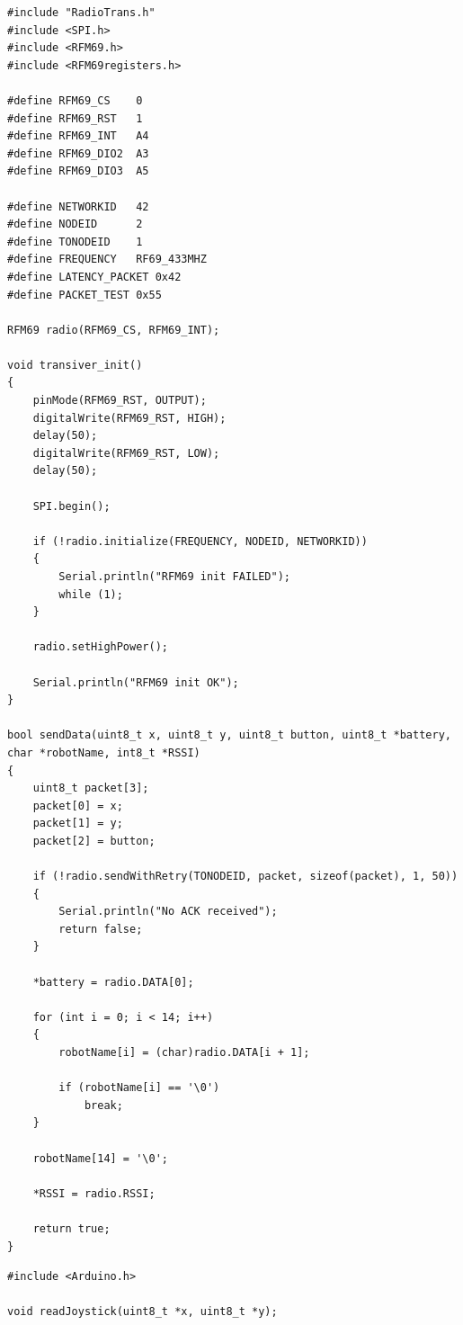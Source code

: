 \begin{lstlisting}[style=appendix, caption={Remote --- RadioTrans.cpp}, label={lst:remote-radio}]
#include "RadioTrans.h"
#include <SPI.h>
#include <RFM69.h>
#include <RFM69registers.h>

#define RFM69_CS    0
#define RFM69_RST   1
#define RFM69_INT   A4
#define RFM69_DIO2  A3
#define RFM69_DIO3  A5

#define NETWORKID   42
#define NODEID      2
#define TONODEID    1
#define FREQUENCY   RF69_433MHZ
#define LATENCY_PACKET 0x42
#define PACKET_TEST 0x55

RFM69 radio(RFM69_CS, RFM69_INT);

void transiver_init()
{
    pinMode(RFM69_RST, OUTPUT);
    digitalWrite(RFM69_RST, HIGH);
    delay(50);
    digitalWrite(RFM69_RST, LOW);
    delay(50);

    SPI.begin();

    if (!radio.initialize(FREQUENCY, NODEID, NETWORKID))
    {
        Serial.println("RFM69 init FAILED");
        while (1);
    }

    radio.setHighPower();

    Serial.println("RFM69 init OK");
}

bool sendData(uint8_t x, uint8_t y, uint8_t button, uint8_t *battery, char *robotName, int8_t *RSSI)
{
    uint8_t packet[3];
    packet[0] = x;
    packet[1] = y;
    packet[2] = button;

    if (!radio.sendWithRetry(TONODEID, packet, sizeof(packet), 1, 50))
    {
        Serial.println("No ACK received");
        return false;
    }

    *battery = radio.DATA[0];

    for (int i = 0; i < 14; i++)
    {
        robotName[i] = (char)radio.DATA[i + 1];

        if (robotName[i] == '\0')
            break;
    }

    robotName[14] = '\0';

    *RSSI = radio.RSSI;

    return true;
}
\end{lstlisting}

\begin{lstlisting}[style=appendix, caption={Remote --- Joystick.h}, label={lst:remote-joystick-h}]
#include <Arduino.h>

void readJoystick(uint8_t *x, uint8_t *y);
\end{lstlisting}

